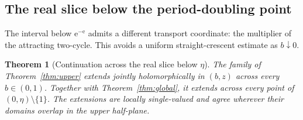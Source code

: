\documentclass[11pt]{amsart}
\newtheorem{theorem}{Theorem}[section]
\theoremstyle{definition}
\newcommand{\eee}{\mathrm{e}}
\begin{document}
\subsection{The real slice below the period-doubling point}\label{sec:two-cycle}
The interval below $\eee^{-\eee}$ admits a different transport coordinate:
the multiplier of the attracting two-cycle.  This avoids a uniform
straight-crescent estimate as $b\downarrow0$.

\begin{theorem}[Continuation across the real slice below $\eta$]\label{thm:positive-real-axis}
The family of Theorem~\ref{thm:upper} extends jointly holomorphically in
$(b,z)$ across every $b\in(0,1)$.  Together with
Theorem~\ref{thm:global}, it extends across every point of
$(0,\eta)\setminus\{1\}$.  The extensions are locally single-valued and
agree wherever their domains overlap in the upper half-plane.
\end{theorem}
\end{document}
